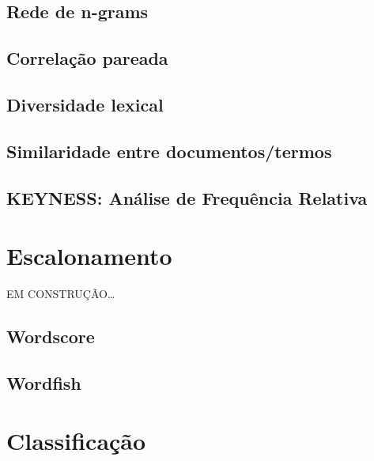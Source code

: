 \documentclass[]{book}
\begin{document}
\hypertarget{rede-de-n-grams}{%
\section{Rede de n-grams}\label{rede-de-n-grams}}

\hypertarget{correlauxe7uxe3o-pareada}{%
\section{Correlação pareada}\label{correlauxe7uxe3o-pareada}}

\hypertarget{diversidade-lexical}{%
\section{Diversidade lexical}\label{diversidade-lexical}}

\hypertarget{similaridade-entre-documentostermos}{%
\section{Similaridade entre documentos/termos}\label{similaridade-entre-documentostermos}}

\hypertarget{keyness-anuxe1lise-de-frequuxeancia-relativa}{%
\section{KEYNESS: Análise de Frequência Relativa}\label{keyness-anuxe1lise-de-frequuxeancia-relativa}}

\hypertarget{scalling}{%
\chapter{Escalonamento}\label{scalling}}

EM CONSTRUÇÃO\ldots{}

\hypertarget{wordscore}{%
\section{Wordscore}\label{wordscore}}

\hypertarget{wordfish}{%
\section{Wordfish}\label{wordfish}}

\hypertarget{classificacao}{%
\chapter{Classificação}\label{classificacao}}
\end{document}
